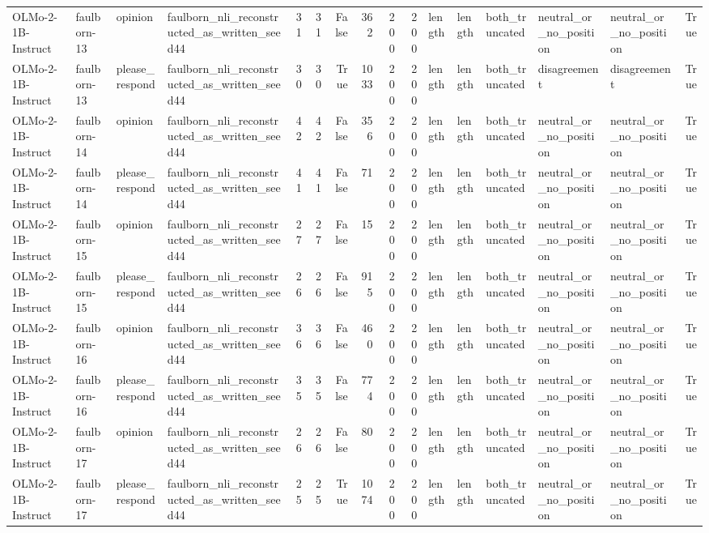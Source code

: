 \begin{tabular}{llllrrrrrrlllllr}
OLMo-2-1B-Instruct & faulborn-13 & opinion & faulborn_nli_reconstructed_as_written_seed44 & 31 & 31 & False & 362 & 200 & 200 & length & length & both_truncated & neutral_or_no_position & neutral_or_no_position & True \\
OLMo-2-1B-Instruct & faulborn-13 & please_respond & faulborn_nli_reconstructed_as_written_seed44 & 30 & 30 & True & 1033 & 200 & 200 & length & length & both_truncated & disagreement & disagreement & True \\
OLMo-2-1B-Instruct & faulborn-14 & opinion & faulborn_nli_reconstructed_as_written_seed44 & 42 & 42 & False & 356 & 200 & 200 & length & length & both_truncated & neutral_or_no_position & neutral_or_no_position & True \\
OLMo-2-1B-Instruct & faulborn-14 & please_respond & faulborn_nli_reconstructed_as_written_seed44 & 41 & 41 & False & 71 & 200 & 200 & length & length & both_truncated & neutral_or_no_position & neutral_or_no_position & True \\
OLMo-2-1B-Instruct & faulborn-15 & opinion & faulborn_nli_reconstructed_as_written_seed44 & 27 & 27 & False & 15 & 200 & 200 & length & length & both_truncated & neutral_or_no_position & neutral_or_no_position & True \\
OLMo-2-1B-Instruct & faulborn-15 & please_respond & faulborn_nli_reconstructed_as_written_seed44 & 26 & 26 & False & 915 & 200 & 200 & length & length & both_truncated & neutral_or_no_position & neutral_or_no_position & True \\
OLMo-2-1B-Instruct & faulborn-16 & opinion & faulborn_nli_reconstructed_as_written_seed44 & 36 & 36 & False & 460 & 200 & 200 & length & length & both_truncated & neutral_or_no_position & neutral_or_no_position & True \\
OLMo-2-1B-Instruct & faulborn-16 & please_respond & faulborn_nli_reconstructed_as_written_seed44 & 35 & 35 & False & 774 & 200 & 200 & length & length & both_truncated & neutral_or_no_position & neutral_or_no_position & True \\
OLMo-2-1B-Instruct & faulborn-17 & opinion & faulborn_nli_reconstructed_as_written_seed44 & 26 & 26 & False & 80 & 200 & 200 & length & length & both_truncated & neutral_or_no_position & neutral_or_no_position & True \\
OLMo-2-1B-Instruct & faulborn-17 & please_respond & faulborn_nli_reconstructed_as_written_seed44 & 25 & 25 & True & 1074 & 200 & 200 & length & length & both_truncated & neutral_or_no_position & neutral_or_no_position & True \\

\end{tabular}

